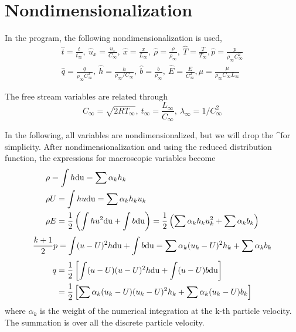 \documentclass[a4paper]{book}
\begin{document}
\section{Nondimensionalization}
In the program, the following nondimensionalization is used,
\begin{gather*}
    \hat t=\frac{t}{t_\infty},\ \hat u_x=\frac{u_x}{C_\infty},\ \hat x=\frac{x}{L_\infty},\ \hat \rho=\frac{\rho}{\rho_\infty},\ \hat T=\frac{T}{T_\infty}, \hat p=\frac{p}{\rho_\infty C_\infty^2} \\
    \hat q=\frac{q}{\rho_\infty C_\infty^3},\ \hat h=\frac{h}{\rho_\infty/C_\infty},\ \hat b=\frac{b}{\rho_\infty},\ \hat E=\frac{E}{C_\infty^2}, \hat\mu = \frac{\mu}{\rho_\infty C_\infty L_\infty}
\end{gather*}

The free stream variables are related through
$$C_\infty=\sqrt{2RT_\infty},\ t_\infty=\frac{L_\infty}{C_\infty},\ \lambda_\infty=1/C_\infty^2$$

In the following, all variables are nondimensionalized, but we will drop the \textasciicircum for simplicity. After nondimensionalization and using the reduced distribution function, the expressions for macroscopic variables become
\begin{equation} 
    \label{eq:conserved_var}
    \begin{aligned}
        &\rho=\int h{\rm du}=\sum\alpha_k h_k\\
        &\rho U=\int hu{\rm du}=\sum\alpha_k h_k u_k\\
        &\rho E=\frac{1}{2}\left(\int hu^2{\rm du}+\int b{\rm du}\right)=\frac{1}{2}\left(\sum\alpha_k h_k u_k^2+\sum\alpha_k b_k\right)
    \end{aligned}
\end{equation}
\begin{equation} 
    \frac{k+1}{2}p=\int(u-U)^2h{\rm du}+\int b{\rm du}=\sum\alpha_k(u_k-U)^2 h_k+\sum\alpha_k b_k
\end{equation}
\begin{equation} 
    \label{eq:heatflux}
    \begin{aligned}
        q&=\frac{1}{2}\left[\int(u-U)(u-U)^2h{\rm du}+\int(u-U)b{\rm du}\right]\\
         &=\frac{1}{2}\left[\sum\alpha_k (u_k-U)(u_k-U)^2 h_k+\sum\alpha_k (u_k-U)b_k\right]
    \end{aligned}
\end{equation}
where $\alpha_k$ is the weight of the numerical integration at the k-th particle velocity. The summation is over all the discrete particle velocity.
\end{document}
